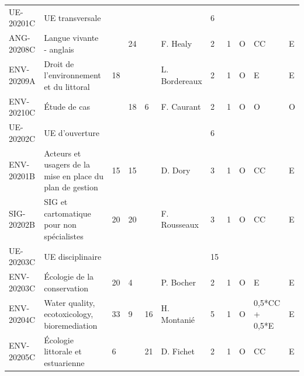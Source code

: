 \documentclass[a4paper,11pt]{article}
\begin{document}
{{\begin{tabular}{lllllllllll}
\rowcolor[HTML]{C0C0C0} 
UE-20201C     & UE transversale                                                                &    &    &    &                 & 6    &      &             &                  &                  \\
ANG-20208C    & Langue vivante - anglais                                                       &    & 24 &    & F. Healy        & 2    & 1    & O           & CC               & E                \\
ENV-20209A    & Droit de l'environnement et du littoral                                        & 18 &    &    & L. Bordereaux   & 2    & 1    & O           & E                & E                \\
ENV-20210C    & Étude de cas                                                                   &    & 18 & 6  & F. Caurant      & 2    & 1    & O           & O                & O                \\
\rowcolor[HTML]{C0C0C0} 
UE-20202C     & UE d'ouverture                                                                 &    &    &    &                 & 6    &      &             &                  &                  \\
ENV-20201B    & Acteurs et usagers de la mise en place du plan de gestion                      & 15 & 15 &    & D. Dory         & 3    & 1    & O           & CC               & E                \\
SIG-20202B    & SIG et cartomatique pour non spécialistes                                      & 20 & 20 &    & F. Rousseaux    & 3    & 1    & O           & CC               & E                \\
\rowcolor[HTML]{C0C0C0} 
UE-20203C     & UE disciplinaire                                                               &    &    &    &                 & 15   &      &             &                  &                  \\
ENV-20203C    & Écologie de la conservation                                                    & 20 & 4  &    & P. Bocher       & 2    & 1    & O           & E                & E                \\
ENV-20204C    & Water quality, ecotoxicology, bioremediation                                   & 33 & 9  & 16 & H. Montanié     & 5    & 1    & O           & 0,5*CC + 0,5*E   & E                \\
ENV-20205C    & Écologie littorale et estuarienne                                              & 6  &    & 21 & D. Fichet       & 2    & 1    & O           & CC               & E                \\

\end{tabular}}}
\end{document}
